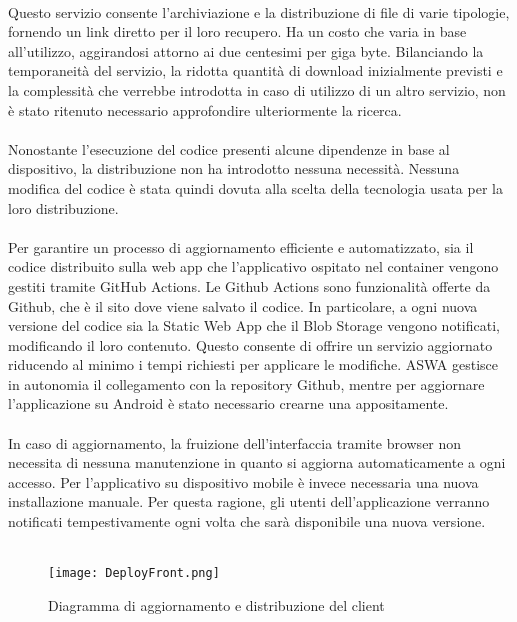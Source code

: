 \\
Questo servizio consente l'archiviazione e la distribuzione di file di varie tipologie,
fornendo un link diretto per il loro recupero.
Ha un costo che varia in base all'utilizzo,
aggirandosi attorno ai due centesimi per giga byte.
Bilanciando la temporaneità del servizio,
la ridotta quantità di download inizialmente previsti e
la complessità che verrebbe introdotta in caso di utilizzo di un altro servizio,
non è stato ritenuto necessario approfondire ulteriormente la ricerca.\\
\\
Nonostante l'esecuzione del codice presenti alcune dipendenze in base al dispositivo,
la distribuzione non ha introdotto nessuna necessità.
Nessuna modifica del codice è stata quindi dovuta alla scelta della tecnologia usata per
la loro distribuzione.\\
\\
Per garantire un processo di aggiornamento efficiente e automatizzato,
sia il codice distribuito sulla web app che l'applicativo ospitato nel container
vengono gestiti tramite GitHub Actions.
Le Github Actions sono funzionalità offerte da Github,
che è il sito dove viene salvato il codice.
In particolare, 
a ogni nuova versione del codice 
sia la Static Web App che il Blob Storage vengono notificati,
modificando il loro contenuto.
Questo consente di offrire un servizio aggiornato
riducendo al minimo i tempi richiesti per applicare le modifiche.
ASWA gestisce in autonomia il collegamento con la repository Github,
mentre per aggiornare l'applicazione su Android è stato necessario crearne una appositamente.\\
\\
In caso di aggiornamento,
la fruizione dell'interfaccia tramite browser non necessita di nessuna manutenzione
in quanto si aggiorna automaticamente a ogni accesso.
Per l'applicativo su dispositivo mobile è invece necessaria una nuova installazione manuale.
Per questa ragione, gli utenti dell'applicazione verranno notificati tempestivamente
ogni volta che sarà disponibile una nuova versione.\\
\\

\begin{figure}[htbp]
    \begin{center}
        \texttt{[image: DeployFront.png]}
        \caption{Diagramma di aggiornamento e distribuzione del client}
    \end{center}
\end{figure}
\clearpage

